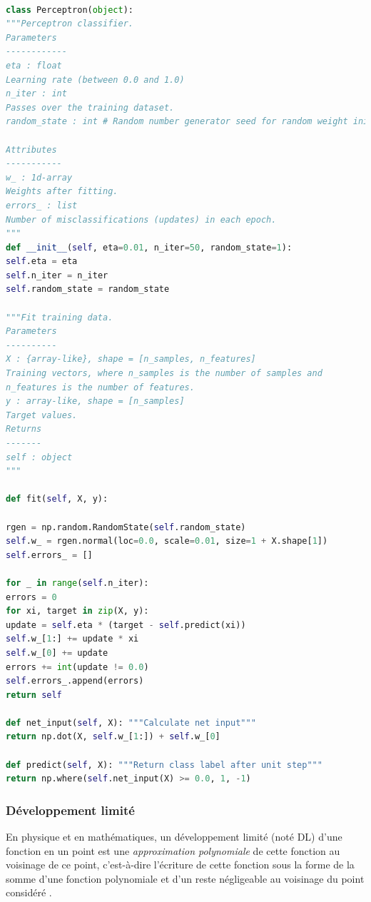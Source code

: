 

	





\begin{lstlisting}[language=python]

class Perceptron(object):
"""Perceptron classifier.
Parameters
------------
eta : float
Learning rate (between 0.0 and 1.0)
n_iter : int
Passes over the training dataset.
random_state : int # Random number generator seed for random weight initialization.

Attributes
-----------
w_ : 1d-array
Weights after fitting.
errors_ : list
Number of misclassifications (updates) in each epoch.
"""
def __init__(self, eta=0.01, n_iter=50, random_state=1):
self.eta = eta
self.n_iter = n_iter
self.random_state = random_state

"""Fit training data.
Parameters
----------
X : {array-like}, shape = [n_samples, n_features]
Training vectors, where n_samples is the number of samples and
n_features is the number of features.
y : array-like, shape = [n_samples]
Target values.
Returns
-------
self : object
"""

def fit(self, X, y):

rgen = np.random.RandomState(self.random_state)
self.w_ = rgen.normal(loc=0.0, scale=0.01, size=1 + X.shape[1])
self.errors_ = []

for _ in range(self.n_iter):
errors = 0
for xi, target in zip(X, y):
update = self.eta * (target - self.predict(xi))
self.w_[1:] += update * xi
self.w_[0] += update
errors += int(update != 0.0)
self.errors_.append(errors)
return self

def net_input(self, X): """Calculate net input"""
return np.dot(X, self.w_[1:]) + self.w_[0]

def predict(self, X): """Return class label after unit step"""
return np.where(self.net_input(X) >= 0.0, 1, -1)
\end{lstlisting}




\subsubsection{\textbf{Développement limité}}\label{sec:dev_lim}
En physique et en mathématiques, un développement limité (noté DL) d'une fonction en un point est une \textit{approximation polynomiale} de cette fonction au voisinage de ce point, c'est-à-dire l'écriture de cette fonction sous la forme de la somme d'une fonction polynomiale et d'un reste négligeable au voisinage du point considéré \cite{coulombeau2013math, benner2015numerical}.

